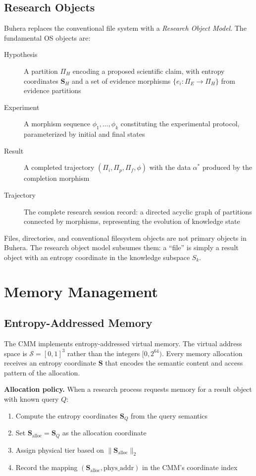 \documentclass[12pt,twocolumn]{article}
\begin{document}
\subsection{Research Objects}

Buhera replaces the conventional file system with a \emph{Research Object Model}. The fundamental OS objects are:

\begin{description}
\item[Hypothesis] A partition $\Pi_H$ encoding a proposed scientific claim, with entropy coordinates $\mathbf{S}_H$ and a set of evidence morphisms $\{e_i: \Pi_E \to \Pi_H\}$ from evidence partitions
\item[Experiment] A morphism sequence $\phi_1, \ldots, \phi_k$ constituting the experimental protocol, parameterized by initial and final states
\item[Result] A completed trajectory $(\Pi_i, \Pi_p, \Pi_f, \phi)$ with the data $\alpha^*$ produced by the completion morphism
\item[Trajectory] The complete research session record: a directed acyclic graph of partitions connected by morphisms, representing the evolution of knowledge state
\end{description}

Files, directories, and conventional filesystem objects are not primary objects in Buhera. The research object model subsumes them: a ``file'' is simply a result object with an entropy coordinate in the knowledge subspace $S_k$.

\section{Memory Management}
\label{sec:memory}

\subsection{Entropy-Addressed Memory}

The CMM implements entropy-addressed virtual memory. The virtual address space is $\mathcal{S} = [0,1]^3$ rather than the integers $[0, 2^{64})$. Every memory allocation receives an entropy coordinate $\mathbf{S}$ that encodes the semantic content and access pattern of the allocation.

\textbf{Allocation policy.} When a research process requests memory for a result object with known query $Q$:
\begin{enumerate}
\item Compute the entropy coordinates $\mathbf{S}_Q$ from the query semantics
\item Set $\mathbf{S}_{\text{alloc}} = \mathbf{S}_Q$ as the allocation coordinate
\item Assign physical tier based on $\|\mathbf{S}_{\text{alloc}}\|_2$
\item Record the mapping $(\mathbf{S}_{\text{alloc}}, \text{phys\_addr})$ in the CMM's coordinate index
\end{enumerate}
\end{document}
